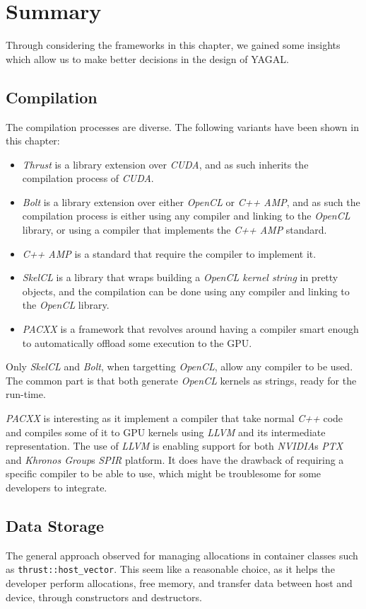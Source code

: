 \section{Summary}
Through considering the frameworks in this chapter, we gained some insights which allow us to make better decisions in the design of YAGAL.

\subsection{Compilation}
The compilation processes are diverse. The following variants have been shown in this chapter:

\begin{itemize}
\item \textit{Thrust} is a library extension over \textit{CUDA}, and as such inherits the compilation process of \textit{CUDA}.
\item \textit{Bolt} is a library extension over either \textit{OpenCL} or \textit{C++ AMP}, and as such the compilation process is either using any compiler and linking to the \textit{OpenCL} library, or using a compiler that implements the \textit{C++ AMP} standard.
\item \textit{C++ AMP} is a standard that require the compiler to implement it.
\item \textit{SkelCL} is a library that wraps building a \textit{OpenCL kernel string} in pretty objects, and the compilation can be done using any compiler and linking to the \textit{OpenCL} library.
\item \textit{PACXX} is a framework that revolves around having a compiler smart enough to automatically offload some execution to the GPU.
\end{itemize}

Only \textit{SkelCL} and \textit{Bolt}, when targetting \textit{OpenCL}, allow any compiler to be used. The common part is that both generate \textit{OpenCL} kernels as strings, ready for the run-time.

\textit{PACXX} is interesting as it implement a compiler that take normal \textit{C++} code and compiles some of it to GPU kernels using \textit{LLVM} and its intermediate representation. The use of \textit{LLVM} is enabling support for both \textit{NVIDIA}s \textit{PTX} and \textit{Khronos Group}s \textit{SPIR} platform. It does have the drawback of requiring a specific compiler to be able to use, which might be troublesome for some developers to integrate.

\subsection{Data Storage}
The general approach observed for managing allocations in container classes such as \texttt{thrust::host\_vector}. This seem like a reasonable choice, as it helps the developer perform allocations, free memory, and transfer data between host and device, through constructors and destructors.

